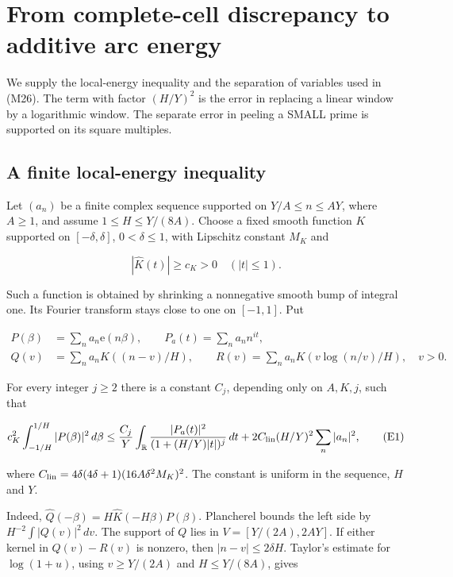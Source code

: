 \hypertarget{local-energy}{%
\section{From complete-cell discrepancy to additive arc
energy}\label{local-energy}}

We supply the local-energy inequality and the separation of variables
used in (M26). The term with factor \((H/Y)^2\) is the error in
replacing a linear window by a logarithmic window. The separate error in
peeling a SMALL prime is supported on its square multiples.


\hypertarget{local-energy-a-finite-local-energy-inequality}{%
\subsection{A finite local-energy
inequality}\label{local-energy-a-finite-local-energy-inequality}}

Let \((a_n)\) be a finite complex sequence supported on
\(Y/A\le n\le AY\), where \(A\ge1\), and assume \(1\le H\le Y/(8A)\).
Choose a fixed smooth function \(K\) supported on \([-\delta,\delta]\),
\(0<\delta\le1\), with Lipschitz constant \(M_K\) and

\[
|\widehat K(t)|\ge c_K>0\quad(|t|\le1).
\]

Such a function is obtained by shrinking a nonnegative smooth bump of
integral one. Its Fourier transform stays close to one on \([-1,1]\).
Put

\[
\begin{aligned}
P(\beta)&=\sum_n a_n\mathrm e(n\beta),\qquad
P_a(t)=\sum_n a_n n^{it},\\
Q(v)&=\sum_n a_nK((n-v)/H),\qquad
R(v)=\sum_n a_nK(v\log(n/v)/H),\quad v>0.
\end{aligned}
\]

For every integer \(j\ge2\) there is a constant \(C_j\), depending only
on \(A,K,j\), such that

\[
c_K^2\int_{-1/H}^{1/H}|P(\beta)|^2\,d\beta
\le \frac{C_j}{Y}\int_{\mathbb R}
 \frac{|P_a(t)|^2}{(1+(H/Y)|t|)^j}\,dt
 +2C_{\rm lin}(H/Y)^2\sum_n|a_n|^2,
\tag{E1}
\]

where \(C_{\rm lin}=4\delta(4\delta+1)(16A\delta^2M_K)^2\). The constant
is uniform in the sequence, \(H\) and \(Y\).

Indeed, \(\widehat Q(-\beta)=H\widehat K(-H\beta)P(\beta)\). Plancherel
bounds the left side by \(H^{-2}\int|Q(v)|^2\,dv\). The support of \(Q\)
lies in \(V=[Y/(2A),2AY]\). If either kernel in \(Q(v)-R(v)\) is
nonzero, then \(|n-v|\le2\delta H\). Taylor's estimate for
\(\log(1+u)\), using \(v\ge Y/(2A)\) and \(H\le Y/(8A)\), gives

